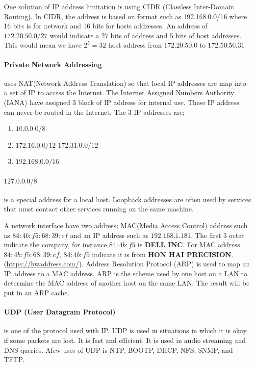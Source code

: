 \documentclass[7x9]{times}
\begin{document}
One solution of IP address limitation is using CIDR 
(Classless Inter-Domain Routing). In CIDR, the address is 
based on format such as 192.168.0.0/16 where 16 bits is for 
network and 16 bits for hosts addresses. An address of 
$172.20.50.0/27$ would indicate a 27 bits of address and 5 
bits of host addresses. This would mean we have $2^5=32$ 
host address from $172.20.50.0$ to $172.50.50.31$

\paragraph{Private Network Addressing} uses NAT(Network
Address Translation) so that local IP addresses are map into
a set of IP to access the Internet. The Internet Assigned
Numbers Authority (IANA) have assigned 3 block of IP 
address for internal use. These IP address can never be 
routed in the Internet. The 3 IP addresses are;
\begin{enumerate}
    \item $10.0.0.0/8$
    \item $172.16.0.0/12$-$172.31.0.0/12$
    \item $192.168.0.0/16$
\end{enumerate}

\paragraph{$127.0.0.0/8$} is a special address for a local
host. Loopback addresses are often used by services that
must contact other services running on the same machine. 

A network interface have two address; MAC(Media Access
Control) address such as $84:4b:f5:68:39:cf$ and an IP
address such as $192.168.1.181$. The first 3 octat indicate
the company, for instance $84:4b:f5$ is \textbf{DELL INC}.
For MAC address $84:4b:f5:68:39:cf$, $84:4b:f5$ indicate it
is from \textbf{HON HAI PRECISION}.
(\url{https://hwaddress.com/}). Address Resolution Protocol
(ARP) is used to map an IP address to a MAC address. ARP is
the scheme used by one host on a LAN to determine the MAC
address of another host on the same LAN. The result will be
put in an ARP cache.


\paragraph{UDP (User Datagram Protocol)} is one of the 
protocol used with IP. UDP is used in situations in which 
it is okay if some packets are lost. It is fast and 
efficient. It is used in audio streaming and DNS queries. 
Afew uses of UDP is NTP, BOOTP, DHCP, NFS, SNMP, and TFTP. 
\end{document}
